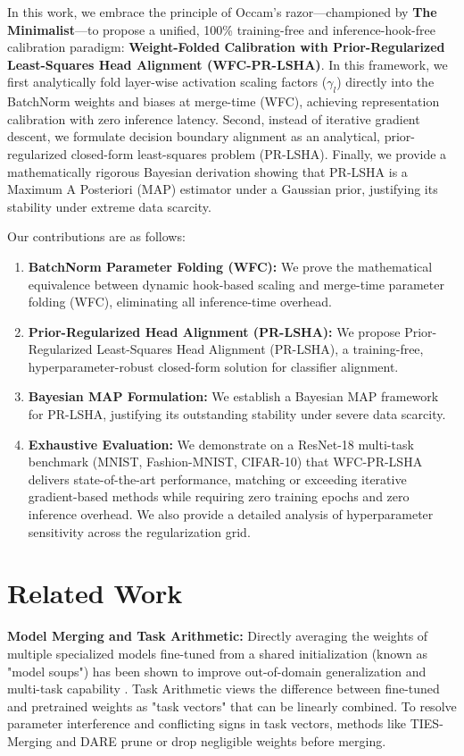 \documentclass{article}
\theoremstyle{plain}
\theoremstyle{definition}
\theoremstyle{remark}
\begin{document}
In this work, we embrace the principle of Occam's razor—championed by \textbf{The Minimalist}—to propose a unified, 100\% training-free and inference-hook-free calibration paradigm: \textbf{Weight-Folded Calibration with Prior-Regularized Least-Squares Head Alignment (WFC-PR-LSHA)}. In this framework, we first analytically fold layer-wise activation scaling factors ($\gamma_l$) directly into the BatchNorm weights and biases at merge-time (WFC), achieving representation calibration with zero inference latency. Second, instead of iterative gradient descent, we formulate decision boundary alignment as an analytical, prior-regularized closed-form least-squares problem (PR-LSHA). Finally, we provide a mathematically rigorous Bayesian derivation showing that PR-LSHA is a Maximum A Posteriori (MAP) estimator under a Gaussian prior, justifying its stability under extreme data scarcity.

Our contributions are as follows:
\begin{enumerate}
    \item \textbf{BatchNorm Parameter Folding (WFC):} We prove the mathematical equivalence between dynamic hook-based scaling and merge-time parameter folding (WFC), eliminating all inference-time overhead.
    \item \textbf{Prior-Regularized Head Alignment (PR-LSHA):} We propose Prior-Regularized Least-Squares Head Alignment (PR-LSHA), a training-free, hyperparameter-robust closed-form solution for classifier alignment.
    \item \textbf{Bayesian MAP Formulation:} We establish a Bayesian MAP framework for PR-LSHA, justifying its outstanding stability under severe data scarcity.
    \item \textbf{Exhaustive Evaluation:} We demonstrate on a ResNet-18 multi-task benchmark (MNIST, Fashion-MNIST, CIFAR-10) that WFC-PR-LSHA delivers state-of-the-art performance, matching or exceeding iterative gradient-based methods while requiring zero training epochs and zero inference overhead. We also provide a detailed analysis of hyperparameter sensitivity across the regularization grid.
\end{enumerate}

\section{Related Work}
\label{sec:related}

\textbf{Model Merging and Task Arithmetic:} Directly averaging the weights of multiple specialized models fine-tuned from a shared initialization (known as "model soups") has been shown to improve out-of-domain generalization and multi-task capability \cite{wortsman2022model, matena2022merging}. Task Arithmetic \cite{ilharco2022editing} views the difference between fine-tuned and pretrained weights as "task vectors" that can be linearly combined. To resolve parameter interference and conflicting signs in task vectors, methods like TIES-Merging \cite{yadav2023ties} and DARE \cite{yu2024dare} prune or drop negligible weights before merging.
\end{document}
